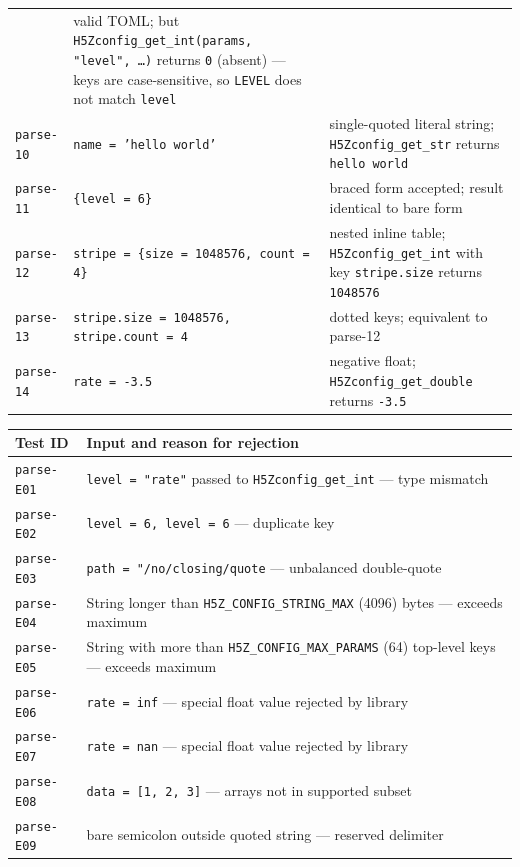 \documentclass[../RFC-HDFG-2026-001.tex]{subfiles}
\begin{document}
\begin{center}
\begin{tabularx}{\textwidth}{l>{\raggedright\arraybackslash\hsize=0.7\hsize}X>{\raggedright\arraybackslash\hsize=1.3\hsize}X}
  & valid TOML; but \texttt{H5Zconfig\_get\_int(params, "level", \ldots)} returns
  \texttt{0} (absent) --- keys are case-sensitive, so \texttt{LEVEL} does not
  match \texttt{level} \\
\texttt{parse-10} & \texttt{name = 'hello world'}
  & single-quoted literal string; \texttt{H5Zconfig\_get\_str} returns \texttt{hello world} \\
\texttt{parse-11} & \texttt{\{level = 6\}}
  & braced form accepted; result identical to bare form \\
\texttt{parse-12} & \texttt{stripe = \{size = 1048576, count = 4\}}
  & nested inline table; \texttt{H5Zconfig\_get\_int} with key \texttt{stripe.size} returns \texttt{1048576} \\
\texttt{parse-13} & \texttt{stripe.size = 1048576, stripe.count = 4}
  & dotted keys; equivalent to parse-12 \\
\texttt{parse-14} & \texttt{rate = -3.5}
  & negative float; \texttt{H5Zconfig\_get\_double} returns \texttt{-3.5} \\
\bottomrule
\end{tabularx}
\end{center}


\begin{center}
\small
\renewcommand{\arraystretch}{1.25}
\begin{tabularx}{\textwidth}{lX}
\toprule
\textbf{Test ID} & \textbf{Input and reason for rejection} \\
\midrule
\texttt{parse-E01} & \texttt{level = "rate"} passed to \texttt{H5Zconfig\_get\_int} --- type mismatch \\
\texttt{parse-E02} & \texttt{level = 6, level = 6} --- duplicate key \\
\texttt{parse-E03} & \texttt{path = "/no/closing/quote} --- unbalanced double-quote \\
\texttt{parse-E04} & String longer than \texttt{H5Z\_CONFIG\_STRING\_MAX} (4096) bytes --- exceeds maximum \\
\texttt{parse-E05} & String with more than \texttt{H5Z\_CONFIG\_MAX\_PARAMS} (64) top-level keys --- exceeds maximum \\
\texttt{parse-E06} & \texttt{rate = inf} --- special float value rejected by library \\
\texttt{parse-E07} & \texttt{rate = nan} --- special float value rejected by library \\
\texttt{parse-E08} & \texttt{data = [1, 2, 3]} --- arrays not in supported subset \\
\texttt{parse-E09} & bare semicolon outside quoted string --- reserved delimiter \\
\bottomrule
\end{tabularx}
\end{center}
\end{document}
